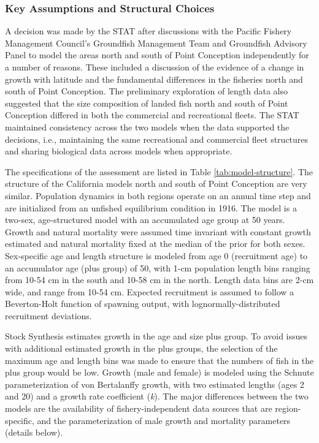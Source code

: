 \documentclass[11pt,
  english,
  letterpaper,
]{article}
\begin{document}
\hypertarget{key-assumptions-and-structural-choices}{%
\subsubsection{Key Assumptions and Structural Choices}\label{key-assumptions-and-structural-choices}}

A decision was made by the STAT after discussions with the Pacific Fishery Management Council's Groundfish Management Team and Groundfish Advisory Panel to model the areas north and south of Point Conception independently for a number of reasons. These included a discussion of the evidence of a change in growth with latitude and the fundamental differences in the fisheries north and south of Point Conception. The preliminary exploration of length data also suggested that the size composition of landed fish north and south of Point Conception differed in both the commercial and recreational fleets. The STAT maintained consistency across the two models when the data supported the decisions, i.e., maintaining the same recreational and commercial fleet structures and sharing biological data across models when appropriate.

The specifications of the assessment are listed in Table \ref{tab:model-structure}. The structure of the California models north and south of Point Conception are very similar. Population dynamics in both regions operate on an annual time step and are initialized from an unfished equilibrium condition in 1916. The model is a two-sex, age-structured model with an accumulated age group at 50 years. Growth and natural mortality were assumed time invariant with constant growth estimated and natural mortality fixed at the median of the prior for both sexes. Sex-specific age and length structure is modeled from age 0 (recruitment age) to an accumulator age (plus group) of 50, with 1-cm population length bins ranging from 10-54 cm in the south and 10-58 cm in the north. Length data bins are 2-cm wide, and range from 10-54 cm. Expected recruitment is assumed to follow a Beverton-Holt function of spawning output, with lognormally-distributed recruitment deviations.

Stock Synthesis estimates growth in the age and size plus group. To avoid issues with additional estimated growth in the plus groups, the selection of the maximum age and length bins was made to ensure that the numbers of fish in the plus group would be low. Growth (male and female) is modeled using the Schnute parameterization of von Bertalanffy growth, with two estimated lengths (ages 2 and 20) and a growth rate coefficient (\emph{k}). The major differences between the two models are the availability of fishery-independent data sources that are region-specific, and the parameterization of male growth and mortality parameters (details below).
\end{document}
